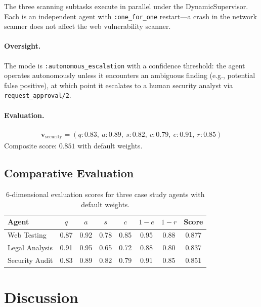 \documentclass[12pt,a4paper]{article}
\theoremstyle{definition}
\theoremstyle{remark}
\begin{document}
The three scanning subtasks execute in parallel under the DynamicSupervisor. Each is an independent agent with \texttt{:one\_for\_one} restart---a crash in the network scanner does not affect the web vulnerability scanner.

\paragraph{Oversight.} The mode is \texttt{:autonomous\_escalation} with a confidence threshold: the agent operates autonomously unless it encounters an ambiguous finding (e.g., potential false positive), at which point it escalates to a human security analyst via \texttt{request\_approval/2}.

\paragraph{Evaluation.}
\begin{align*}
  \mathbf{v}_{\text{security}} = (q: 0.83,\ a: 0.89,\ s: 0.82,\ c: 0.79,\ e: 0.91,\ r: 0.85)
\end{align*}
Composite score: $0.851$ with default weights.

\subsection{Comparative Evaluation}

\begin{table}[H]
\centering
\begin{tabular}{@{}lcccccc|c@{}}
\toprule
\textbf{Agent} & $q$ & $a$ & $s$ & $c$ & $1-e$ & $1-r$ & \textbf{Score} \\
\midrule
Web Testing & 0.87 & 0.92 & 0.78 & 0.85 & 0.95 & 0.88 & 0.877 \\
Legal Analysis & 0.91 & 0.95 & 0.65 & 0.72 & 0.88 & 0.80 & 0.837 \\
Security Audit & 0.83 & 0.89 & 0.82 & 0.79 & 0.91 & 0.85 & 0.851 \\
\bottomrule
\end{tabular}
\caption{6-dimensional evaluation scores for three case study agents with default weights.}\label{tab:case-study-eval}
\end{table}

\section{Discussion}\label{sec:discussion}
\end{document}
